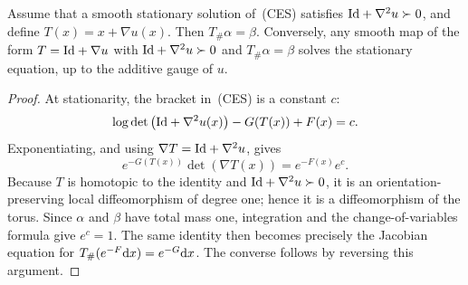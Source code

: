 \begin{prop}\label{prop-continuous-sinkhorn-stationary}
	Assume that a smooth stationary solution of~\textup{(CES)} satisfies $\mathrm{Id}+\nabla^2u\succ0$, and define $T(x)=x+\nabla u(x)$.  Then $T_{\#}\alpha=\beta$.  Conversely, any smooth map of the form $T=\mathrm{Id}+\nabla u$ with $\mathrm{Id}+\nabla^2u\succ0$ and $T_{\#}\alpha=\beta$ solves the stationary equation, up to the additive gauge of $u$.
\end{prop}

\begin{proof}
	At stationarity, the bracket in~\textup{(CES)} is a constant $c$:
	\[
		\log\det\big(\mathrm{Id}+\nabla^2u(x)\big)-G(T(x))+F(x)=c .
	\]
	Exponentiating, and using $\nabla T=\mathrm{Id}+\nabla^2u$, gives
	\[
		e^{-G(T(x))}\det(\nabla T(x))=e^{-F(x)}e^c .
	\]
	Because $T$ is homotopic to the identity and $\mathrm{Id}+\nabla^2u\succ0$, it is an orientation-preserving local diffeomorphism of degree one; hence it is a diffeomorphism of the torus.  Since $\alpha$ and $\beta$ have total mass one, integration and the change-of-variables formula give $e^c=1$.  The same identity then becomes precisely the Jacobian equation for $T_{\#}(e^{-F}\mathrm{d} x)=e^{-G}\mathrm{d} x$.  The converse follows by reversing this argument.
\end{proof}

